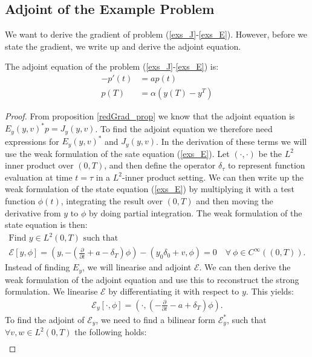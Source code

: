 \subsection{Adjoint of the Example Problem}
We want to derive the gradient of problem (\ref{exs_J}-\ref{exs_E}). However, before we state the gradient, we write up and derive the adjoint equation.
\begin{proposition} \label{adjoint_eq_prop}
The adjoint equation of the problem (\ref{exs_J}-\ref{exs_E}) is:
\begin{align}     
-p'(t) &= ap(t) \label{exs_adjoint_eq}\\
p(T) &= \alpha(y(T)-y^T)   \label{exs_adjoint_ic}  
\end{align}
\end{proposition}
\begin{proof}
From proposition \ref{redGrad_prop} we know that the adjoint equation is $E_y(y,v)^{*}p=J_y(y,v)$. To find the adjoint equation we therefore need expressions for $E_y(y,v)^{*}$ and $J_y(y,v)$. In the derivation of these terms we will use the weak formulation of the sate equation (\ref{exs_E}). Let $(\cdot,\cdot)$ be the $L^2$ inner product over $(0,T)$, and then define the operator $\delta_{\tau}$ to represent function evaluation at time $t=\tau$ in a $L^2$-inner product setting. We can then write up the weak formulation of the state equation (\ref{exs_E}) by multiplying it with a test function $\phi(t)$, integrating the result over $(0,T)$ and then moving the derivative from $y$ to $\phi$ by doing partial integration. The weak formulation of the state equation is then:
\begin{gather*}
\textrm{Find $y \in L^2(0,T)$ such that}\\
\mathcal{E}[y,\phi]= (y,-(\frac{\partial}{\partial t}+a- \delta_T)\phi) -(y_0\delta_0+v,\phi)=0\quad	 \forall \ \phi \in C^{\infty}((0,T)).
\end{gather*}
Instead of finding $E_y$, we will linearise and adjoint $\mathcal{E}$. We can then derive the weak formulation of the adjoint equation and use this to reconstruct the strong formulation. We linearise $\mathcal{E}$ by differentiating it with respect to $y$. This yields:
\begin{align*}
\mathcal{E}_y[\cdot,\phi]=(\cdot,(-\frac{\partial}{\partial t} - a + \delta_T)\phi).
\end{align*}
To find the adjoint of $\mathcal{E}_y$, we need to find a bilinear form $\mathcal{E}_y^*$, such that $\forall v,w\in L^2(0,T)$ the following holds:
\begin{align*}

\end{align*}
\end{proof}
